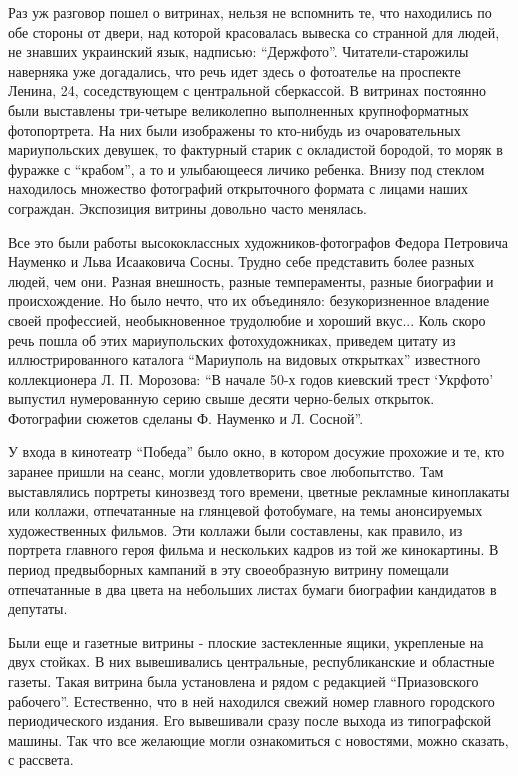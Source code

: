 Раз уж разговор пошел о витринах, нельзя не вспомнить те, что находились по обе
стороны от двери, над которой красовалась вывеска со странной для людей, не
знавших украинский язык, надписью: \enquote{Держфото}. Читатели-старожилы наверняка
уже догадались, что речь идет здесь о фотоателье на проспекте Ленина, 24,
соседствующем с централь­ной сберкассой. В витринах постоянно были выставлены
три-четыре великолепно выполненных крупноформатных фотопортрета. На них были
изображены то кто-нибудь из очаровательных мариупольских девушек, то фактурный
старик с окладистой бородой, то моряк в фуражке с \enquote{крабом}, а то и улыбающееся
личико ребенка. Внизу под стеклом находилось множество фотографий открыточного
формата с лицами наших сограждан. Экспозиция витрины довольно часто менялась.

Все это были работы высококлассных художников-фото­графов Федора Петровича
Науменко и Льва Исааковича Сосны. Трудно себе представить более разных людей,
чем они. Разная внешность, разные темпераменты, разные биографии и
происхождение. Но было нечто, что их объединяло: безукоризненное владение
своей профессией, необык­новенное трудолюбие и хороший вкус... Коль скоро речь
пошла об этих мариупольских фотохудожниках, приведем цитату из
иллюстрированного каталога \enquote{Мариуполь на видовых открытках} известного
коллекционера Л. П. Морозова: \enquote{В начале 50-х годов киевский трест \enquote{Укрфото}
выпустил нумерованную серию свыше десяти черно-белых открыток. Фотографии
сюжетов сделаны Ф. Науменко и Л. Сосной}.

У входа в кинотеатр \enquote{Победа} было окно, в котором досужие прохожие и те, кто
заранее пришли на сеанс, могли удовлетворить свое любопытство. Там выставлялись
портреты кинозвезд того времени, цветные рекламные киноплакаты или коллажи,
отпечатанные на глянцевой фотобумаге, на темы анонсируемых художе­ственных
фильмов. Эти коллажи были составлены, как правило, из портрета главного героя
фильма и нескольких кадров из той же кинокартины. В период предвыборных
кампаний в эту своеобразную витрину помещали отпечатанные в два цвета на
небольших листах бумаги биографии кандидатов в депутаты.

Были еще и газетные витрины - плоские застеклен­ные ящики, укрепленые на двух
стойках. В них вывешива­лись центральные, республиканские и областные газеты.
Такая витрина была установлена и рядом с редакцией \enquote{Приазовского рабочего}.
Естественно, что в ней находился свежий номер главного городского
периодического издания. Его вывешивали сразу после выхода из типографской
машины. Так что все желающие могли ознакомиться с новостями, можно сказать, с
рассвета.

